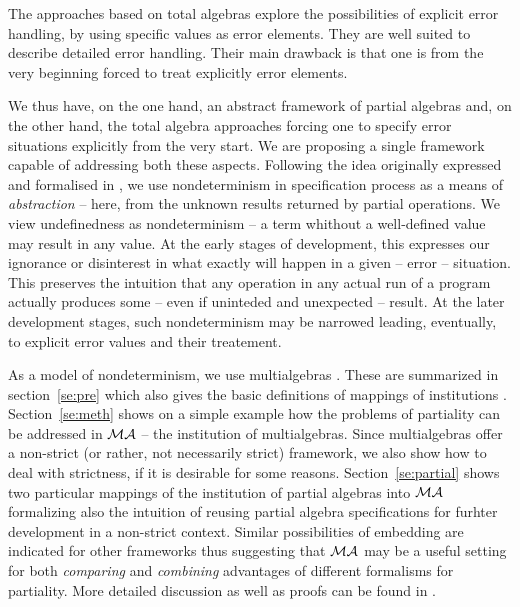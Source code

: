 \documentclass[10pt]{article}
\begin{document}
The approaches based on total algebras explore the possibilities of explicit
error handling, by using specific values as error elements. They are well
suited to describe detailed error handling. Their main drawback is that one
is from the very beginning forced to treat explicitly error elements.

We thus have, on the one hand, an abstract framework of partial algebras
and, on the other hand, the total algebra approaches forcing one to specify
error situations explicitly from the very start.
We are proposing a single framework capable of addressing both these
aspects. Following the idea originally expressed and formalised in \cite{calc},
we use nondeterminism in specification process as a means of {\em
abstraction} -- here, from the unknown results returned by partial operations.
We view undefinedness as nondeterminism -- a term whithout a
well-defined value may result in any value. At the early stages of
development, this expresses our ignorance or disinterest in
what exactly will happen in a given -- error -- situation. This preserves
the intuition that any operation in any actual run of a program actually
produces some -- even if uninteded and unexpected -- result. At the later development
stages, such nondeterminism may be narrowed leading, eventually, to explicit
error values and their treatement.

As a model of nondeterminism, we use multialgebras \cite{calc,multi}.
These are summarized in section~\ref{se:pre} which also gives the basic
definitions of mappings of institutions \cite{inst}.
Section~\ref{se:meth} shows on a simple example how the problems of partiality can be
addressed in ${\mathcal{MA}}$ -- the institution of multialgebras.  Since
multialgebras offer a non-strict (or rather, not necessarily strict)
framework, we also show how to deal with strictness, if it is desirable for
some reasons.  Section~\ref{se:partial} shows two particular mappings of the
institution of partial algebras into ${\mathcal{MA}}$ formalizing also the
intuition of reusing partial algebra specifications for furhter development
in a non-strict context. Similar possibilities of embedding are indicated for
other frameworks thus suggesting that ${\mathcal{MA}}$ may be a useful setting for
both {\em comparing} and {\em combining} advantages of different formalisms
for partiality. More detailed discussion as well as proofs can be found in \cite{TR}.

  
\end{document}
